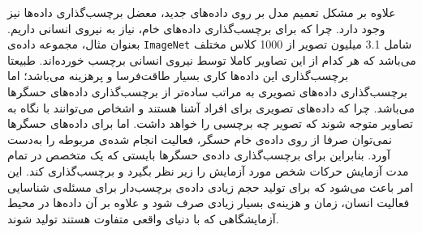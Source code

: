 علاوه بر مشکل تعمیم مدل بر روی داده‌های جدید، معضل برچسب‌گذاری داده‌ها نیز وجود دارد. چرا که برای برچسب‌گذاری داده‌های خام، نیاز به نیروی انسانی داریم. بعنوان مثال، مجموعه داده‌ی
\verb|ImageNet|
شامل 3.1 میلیون تصویر از 1000 کلاس مختلف می‌باشد که هر کدام از این تصاویر کاملا توسط نیروی انسانی برچسب خورده‌اند\cite{deng2009imagenet}.
طبیعتا برچسب‌گذاری این داده‌ها کاری بسیار طاقت‌فرسا و پرهزینه می‌باشد؛ اما برچسب‌گذاری داده‌های تصویری به مراتب ساده‌تر از برچسب‌گذاری داده‌های حسگرها می‌باشد. چرا که داده‌های تصویری برای افراد آشنا هستند و اشخاص می‌توانند با نگاه به تصاویر متوجه شوند که تصویر چه برچسبی را خواهد داشت. اما برای داده‌های حسگرها نمی‌توان صرفا از روی داده‌ی خام حسگر، فعالیت انجام شده‌ی مربوطه را به‌دست آورد. بنابراین برای برچسب‌گذاری داده‌ی حسگرها بایستی که یک متخصص در تمام مدت آزمایش حرکات شخص مورد آزمایش را زیر نظر بگیرد و برچسب‌گذاری کند. این امر باعث می‌شود که برای تولید حجم زیادی داده‌ی برچسب‌دار برای مسئله‌ی شناسایی فعالیت انسان، زمان و هزینه‌ی بسیار زیادی صرف شود و علاوه بر آن داده‌ها در محیط آزمایشگاهی که با دنیای واقعی متفاوت هستند تولید شوند.

